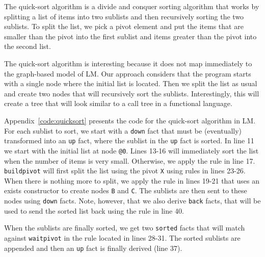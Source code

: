 The quick-sort algorithm is a divide and conquer sorting algorithm that works by splitting
a list of items into two sublists and then recursively sorting the two sublists.
To split the list, we pick a pivot element and put the items that are smaller than the pivot
into the first sublist and items greater than the pivot into the second list.

The quick-sort algorithm is interesting because it does not map immediately to the graph-based
model of LM. Our approach considers that the program starts with a single node where
the initial list is located. Then we split the list as usual and create two nodes
that will recursively sort the sublists. Interestingly, this will create a tree
that will look similar to a call tree in a functional language.

Appendix~\ref{code:quicksort} presents the code for the quick-sort algorithm in LM.
For each sublist to sort, we start with a \texttt{down} fact that must be (eventually)
transformed into an \texttt{up} fact, where the sublist in the \texttt{up} fact is sorted.
In line 11 we start with the initial list at node \texttt{@0}. Lines 13-16 will immediately
sort the list when the number of items is very small. Otherwise, we apply the rule in line 17.
\texttt{buildpivot} will first split the list using the pivot \texttt{X} using rules in
lines 23-26. When there is nothing more to split, we apply the rule in lines 19-21
that uses an exists constructor to create nodes \texttt{B} and \texttt{C}. The sublists
are then sent to these nodes using \texttt{down} facts. Note, however, that we also
derive \texttt{back} facts, that will be used to send the sorted list back using the rule
in line 40.

When the sublists are finally sorted, we get two \texttt{sorted} facts that will match
against \texttt{waitpivot} in the rule located in lines 28-31. The sorted sublists
are appended and then an \texttt{up} fact is finally derived (line 37).

